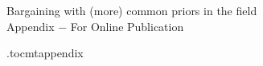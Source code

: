 
% 


%     


% 


\setcounter{table}{0}
\setcounter{figure}{0}
\setcounter{section}{0}


\begin{center}
	\LARGE Bargaining with (more) common priors in the field \\[0.5em]
	\Large{Appendix $-$ For Online Publication} \\[1em]
	\large \author{Joyce Sadka \and Enrique Seira  \and Christopher Woodruff}
\end{center}

\appendix
{}
\renewcommand\thefigure{OA-\arabic{figure}}
\renewcommand\thetable{OA-\arabic{table}}
\renewcommand*{\thepage}{OA - \arabic{page}}
\renewcommand\thesection{Appendix \Alph{section}.}
\renewcommand\thesubsection{\Alph{section}.\arabic{subsection}}

\renewcommand\cftsecdotsep{\cftdotsep}
\renewcommand\cftsubsecdotsep{\cftnodots}
\renewcommand{\cftsecnumwidth}{6em}
 \renewcommand{\cftpnumalign}{r}


\renewcommand{\cftsecleader}{\cftdotfill{\cftsecdotsep}\hspace{1.8em}}

\etocdepthtag.toc{mtappendix}


\begingroup
\let\clearpage\relax
\tableofcontents
\endgroup


